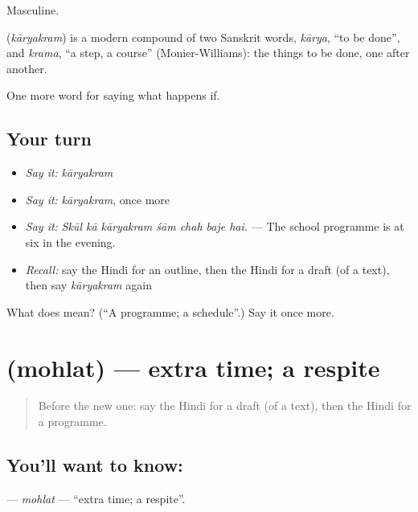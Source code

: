 Masculine.

\begin{cousinweb}
\textbf{} (\emph{kāryakram}) is a modern compound of two Sanskrit words, \emph{kārya}, \textquotedblleft{}to be done\textquotedblright{}, and \emph{krama}, \textquotedblleft{}a step, a course\textquotedblright{} (Monier-Williams): the things to be done, one after another.
\end{cousinweb}

\begin{grammarlens}[title={What you've built}]
One more word for saying what happens if.
\end{grammarlens}

\subsection*{Your turn}
\begin{itemize}
\raggedright
  \item \emph{Say it:} \emph{kāryakram}
  \item \emph{Say it:} \emph{kāryakram}, once more
  \item \emph{Say it:} \emph{Skūl kā kāryakram śām chah baje hai.} — The school programme is at six in the evening.
  \item \emph{Recall:} say the Hindi for an outline, then the Hindi for a draft (of a text), then say \emph{kāryakram} again
\end{itemize}

\begin{tcolorbox}[breakable,colback=teal!4,colframe=teal!35!black,title={Before you move on}]
What does  mean? (\textquotedblleft{}A programme; a schedule\textquotedblright{}.) Say it once more.
\end{tcolorbox}
\section[\texorpdfstring{\hi{मोहलत} (mohlat)}{मोहलत (mohlat)}]{ (mohlat) — extra time; a respite}

\label{lesson:HI-C537-mohlat}



\begin{quote}
Before the new one: say the Hindi for a draft (of a text), then the Hindi for a programme.
\end{quote}

\subsection*{You'll want to know: }
\textbf{} — \emph{mohlat} — \textquotedblleft{}extra time; a respite\textquotedblright{}.

